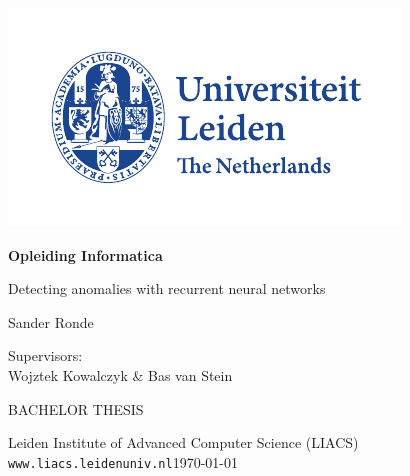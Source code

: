 \thispagestyle{empty}

\includegraphics{resources/logoleiden}

\vspace{-2.5cm}\hfill \begin{huge}\textbf{Opleiding Informatica}\end{huge}

\vspace{5cm}
\begin{Large}
\hfill Detecting anomalies with recurrent neural networks

\vspace*{25mm}

\hfill Sander Ronde
\end{Large}

\vspace*{4.5cm}

\begin{large}

Supervisors:\\
Wojztek Kowalczyk \& Bas van Stein


\vspace*{2.8cm}
BACHELOR THESIS

\vspace*{5mm}
Leiden Institute of Advanced Computer Science (LIACS)\\
\texttt{www.liacs.leidenuniv.nl}\hfill \today
\end{large}

